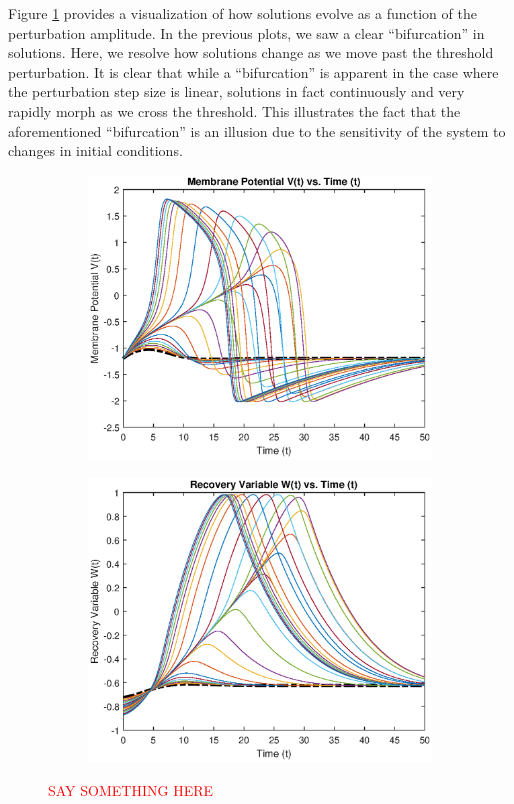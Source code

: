 \documentclass{book}
\theoremstyle{definition}
\begin{document}
Figure \ref{Fig:9} provides a visualization of how solutions evolve as a function of the perturbation amplitude. In the previous plots, we saw a clear ``bifurcation'' in solutions. Here, we resolve how solutions change as we move past the threshold perturbation. It is clear that while a ``bifurcation'' is apparent in the case where the perturbation step size is linear, solutions in fact continuously and very rapidly morph as we cross the threshold. This illustrates the fact that the aforementioned ``bifurcation'' is an illusion due to the sensitivity of the system to changes in initial conditions.  


\begin{figure}[!htb]
	\centering
	\begin{subfigure}{0.5\textwidth}
		\centering
		\includegraphics[scale=0.6]{FHN_lab/V_t_5.eps}
	\end{subfigure}%
	\begin{subfigure}{0.5\textwidth}
		\centering
		\includegraphics[scale=0.6]{FHN_lab/W_t_5.eps}
		
	\end{subfigure}%
	\caption{\textcolor{red}{SAY SOMETHING HERE}}
	\label{Fig:9}
\end{figure}
\end{document}
